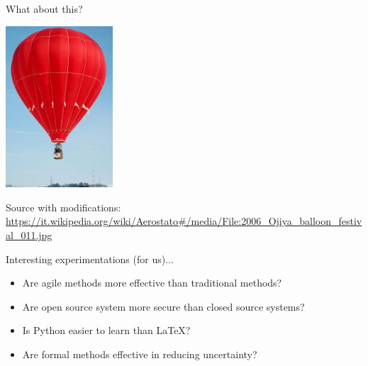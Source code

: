 \documentclass{beamer}
\begin{document}
\begin{frame}
{\centerline{What about this?}}

\begin{center}
\includegraphics[width=4cm]{A2022.IDSEPC.SperimentazioneDeduzione/Mongolfiera.jpg}
\end{center} 

\begin{center}
\tiny
Source with modifications:\\
\url{https://it.wikipedia.org/wiki/Aerostato\#/media/File:2006_Ojiya_balloon_festival_011.jpg}
\end{center} 

\end{frame}

\begin{frame}
{\centerline{Interesting experimentations (for us)...}}

\begin{itemize}
\item Are agile methods more effective than traditional methods?
\item Are open source system more secure than closed source systems?
\item Is Python easier to learn than \LaTeX?
\item Are formal methods effective in reducing uncertainty?
\end{itemize}

\end{frame}
\end{document}

